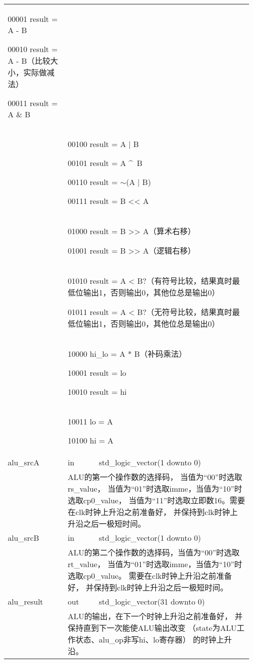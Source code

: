 \begin{tabularx}{\textwidth}{lll}
{            00001 result = A - B

            00010 result = A - B（比较大小，实际做减法）

            00011 result = A \& B
            } \\
            &
            \multicolumn{2}{X}{
            00100 result = A | B

            00101 result = A \textasciicircum \ B

            00110 result = $\sim$(A | B)

            00111 result = B << A
            } \\
            &
            \multicolumn{2}{X}{
            01000 result = B >> A（算术右移）

            01001 result = B >> A（逻辑右移）
            } \\
            &
            \multicolumn{2}{X}{
            01010 result = A < B?（有符号比较，结果真时最低位输出1，否则输出0，其他位总是输出0）

            01011 result = A < B?（无符号比较，结果真时最低位输出1，否则输出0，其他位总是输出0）
            } \\
            &
            \multicolumn{2}{X}{
            10000 hi\_lo = A * B（补码乘法）

            10001 result = lo

            10010 result = hi
            } \\
            &
            \multicolumn{2}{X}{
            10011 lo = A

            10100 hi = A} \\
            \midrule
            alu\_srcA & in & std\_logic\_vector(1 downto 0) \\
            \cmidrule(l){2-3}
            &
            \multicolumn{2}{X}{
            ALU的第一个操作数的选择码，%
            当值为“00”时选取rs\_value，%
            当值为“01”时选取imme，当值为“10”时选取cp0\_value，%
            当值为“11”时选取立即数16。需要在clk时钟上升沿之前准备好，%
            并保持到clk时钟上升沿之后一极短时间。
            } \\
            \midrule
            alu\_srcB & in & std\_logic\_vector(1 downto 0) \\
            \cmidrule(l){2-3}
            &
            \multicolumn{2}{X}{
            ALU的第二个操作数的选择码，当值为“00”时选取rt\_value，%
            当值为“01”时选取imme，当值为“10”时选取cp0\_value。%
            需要在clk时钟上升沿之前准备好，%
            并保持到clk时钟上升沿之后一极短时间。
            } \\
            \midrule
            alu\_result & out & std\_logic\_vector(31 downto 0) \\
            \cmidrule(l){2-3}
            &
            \multicolumn{2}{X}{
            ALU的输出，在下一个时钟上升沿之前准备好，%
            并保持直到下一次能使ALU输出改变%
            （state为ALU工作状态、alu\_op非写hi、lo寄存器）%
            的时钟上升沿。
            } \\
            \bottomrule
            \end{tabularx}
